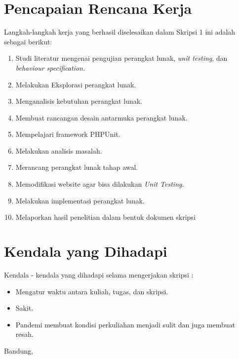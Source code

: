 \documentclass[a4paper,twoside]{article}
\begin{document}
\section{Pencapaian Rencana Kerja}
Langkah-langkah kerja yang berhasil diselesaikan dalam Skripsi 1 ini adalah sebagai berikut:
\begin{enumerate}
\item Studi literatur mengenai pengujian perangkat lunak, \textit{unit testing}, dan \textit{behaviour specification.}
\item Melakukan Eksplorasi perangkat lunak.
\item Menganalisis kebutuhan perangkat lunak.
\item Membuat rancangan desain antarmuka perangkat lunak.
\item Mempelajari framework PHPUnit.
\item Melakukan analisis masalah.
\item Merancang perangkat lunak tahap awal.
\item Memodifikasi website agar bisa dilakukan \textit{Unit Testing}.
\item Melakukan implementasi perangkat lunak.
\item Melaporkan hasil penelitian dalam bentuk dokumen skripsi

\end{enumerate}



\section{Kendala yang Dihadapi}
Kendala - kendala yang dihadapi selama mengerjakan skripsi :
\begin{itemize}
	\item Mengatur waktu antara kuliah, tugas, dan skripsi.
	\item Sakit.
	\item Pandemi membuat kondisi perkuliahan menjadi sulit dan juga membuat resah.
\end{itemize}

\vspace{1cm}
\centering Bandung, \tanggal\\
\vspace{2cm} \nama \\ 
\vspace{1cm}
\end{document}
